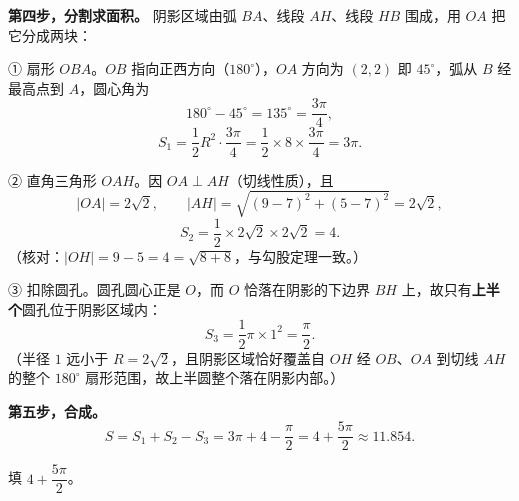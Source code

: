 \begin{answer}
\textbf{第四步，分割求面积。} 阴影区域由弧 $BA$、线段 $AH$、线段 $HB$ 围成，用 $OA$ 把它分成两块：

① 扇形 $OBA$。$OB$ 指向正西方向（$180^\circ$），$OA$ 方向为 $(2,2)$ 即 $45^\circ$，弧从 $B$ 经最高点到 $A$，圆心角为
\nopagebreak[4]
\[180^\circ-45^\circ=135^\circ=\frac{3\pi}4,\]
\nopagebreak[4]
\[S_1=\frac12R^2\cdot\frac{3\pi}4=\frac12\times8\times\frac{3\pi}4=3\pi .\]

② 直角三角形 $OAH$。因 $OA\perp AH$（切线性质），且
\nopagebreak[4]
\[|OA|=2\sqrt2,\qquad |AH|=\sqrt{(9-7)^2+(5-7)^2}=2\sqrt2,\]
\nopagebreak[4]
\[S_2=\frac12\times2\sqrt2\times2\sqrt2=4 .\]
（核对：$|OH|=9-5=4=\sqrt{8+8}$，与勾股定理一致。）

③ 扣除圆孔。圆孔圆心正是 $O$，而 $O$ 恰落在阴影的下边界 $BH$ 上，故只有\textbf{上半个}圆孔位于阴影区域内：
\nopagebreak[4]
\[S_3=\frac12\pi\times1^2=\frac\pi2 .\]
（半径 $1$ 远小于 $R=2\sqrt2$，且阴影区域恰好覆盖自 $OH$ 经 $OB$、$OA$ 到切线 $AH$ 的整个 $180^\circ$ 扇形范围，故上半圆整个落在阴影内部。）

\textbf{第五步，合成。}
\nopagebreak[4]
\[S=S_1+S_2-S_3=3\pi+4-\frac\pi2=4+\frac{5\pi}2\approx11.854 .\]

填 $4+\dfrac{5\pi}2$。


\end{answer}
